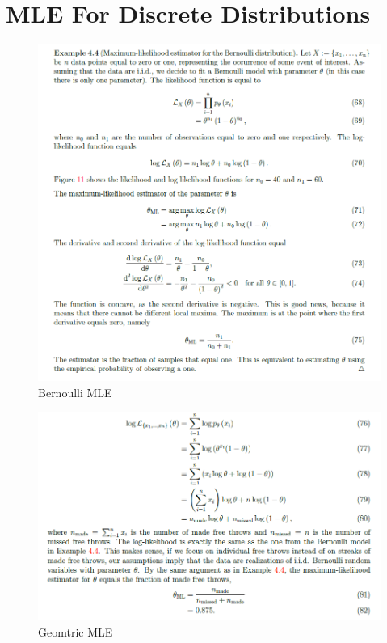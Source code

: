 \documentclass[12pt,twoside]{article}
\begin{document}
\section{MLE For Discrete Distributions}
\begin{figure}[h!]
        \centering
        \includegraphics[scale=.75]{Pictures/loglikelihood_bernoulli.png}
        \caption{Bernoulli MLE}
        \label{fig:my_label}
    \end{figure}
    
\begin{figure}[h!]
        \centering
        \includegraphics[scale=.6]{Pictures/loglikelihood_geometric.png}
        \caption{Geomtric MLE}
        \label{fig:my_label}
    \end{figure}
\end{document}
